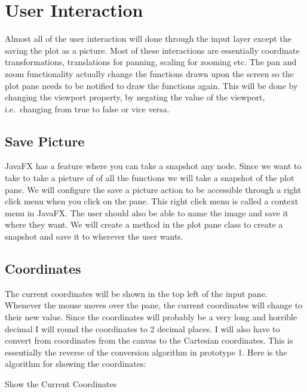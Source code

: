 \documentclass[../../../../main.tex]{subfiles}
\begin{document}
\section{User Interaction}
Almost all of the user interaction will done through the input layer except the saving the plot as a picture. Most of these interactions are essentially coordinate transformations, translations for panning, scaling for zooming etc. The pan and zoom functionality actually change the functions drawn upon the screen so the plot pane needs to be notified to draw the functions again. This will be done by changing the viewport property, by negating the value of the viewport, i.e.\ changing from true to false or vice versa.
\subsection{Save Picture}
JavaFX has a feature where you can take a snapshot\cite{snapshotJava} any node. Since we want to take to take a picture of of all the functions we will take a snapshot of the plot pane. We will configure the save a picture action to be accessible through a right click menu when you click on the pane. This right click menu is called a context menu\cite{contextJava} in JavaFX. The user should also be able to name the image and save it where they want. We will create a method in the plot pane class to create a snapshot and save it to wherever the user wants.
\newpage
\subsection{Coordinates}
The current coordinates will be shown in the top left of the input pane. Whenever the mouse moves over the pane, the current coordinates will change to their new value. Since the coordinates will probably be a very long and horrible decimal I will round the coordinates to 2 decimal places. I will also have to convert from coordinates from the canvas to the Cartesian coordinates. This is essentially the reverse of the conversion algorithm in prototype 1.  Here is the algorithm for showing the coordinates:\\
\begin{algorithm}[H]
\DontPrintSemicolon
\caption{Show the Current Coordinates}
\end{algorithm}
\end{document}
